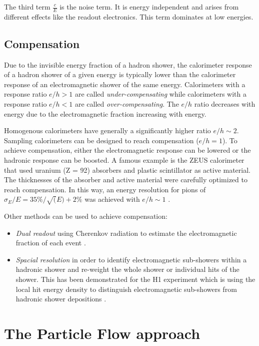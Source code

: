 The third term $\frac{c}{E}$ is the noise term. It is energy independent and arises from different effects like the readout electronics. This term dominates at low energies.

\subsection{Compensation}
\label{subsec:Compensation}

Due to the invisible energy fraction of a hadron shower, the calorimeter response of a hadron shower of a given energy is typically lower than the calorimeter response of an electromagnetic shower of the same energy. Calorimeters with a response ratio $e/h > 1$ are called \textit{under-compensating} while calorimeters with a response ratio $e/h < 1$ are called \textit{over-compensating}. The $e/h$ ratio decreases with energy due to the electromagnetic fraction increasing with energy.

Homogenous calorimeters have generally a significantly higher ratio $e/h \sim 2$. Sampling calorimeters can be designed to reach compensation ($e/h = 1$). To achieve compensation, either the electromagnetic response can be lowered or the hadronic response can be boosted. A famous example is the ZEUS calorimeter that used uranium (Z = 92) absorbers and plastic scintillator as active material. The thicknesses of the absorber and active material were carefully optimized to reach compensation. In this way, an energy resolution for pions of $\sigma_E/E = 35\%/\sqrt(E) + 2\%$ was achieved with $e/h \sim 1$ \cite{BERNSTEIN199323}.

Other methods can be used to achieve compensation:
\begin{itemize}
  \item \textit{Dual readout} using Cherenkov radiation to estimate the electromagnetic fraction of each event \cite{Akchurin:2013yaa}.
  \item \textit{Spacial resolution} in order to identify electromagnetic sub-showers within a hadronic shower and re-weight the whole shower or individual hits of the shower. This has been demonstrated for the H1 experiment which is using the local hit energy density to distinguish electromagnetic sub-showers from hadronic shower depositions \cite{Schacht:1990zw}.
\end{itemize}

\section{The Particle Flow approach}
\label{sec:PFA}

